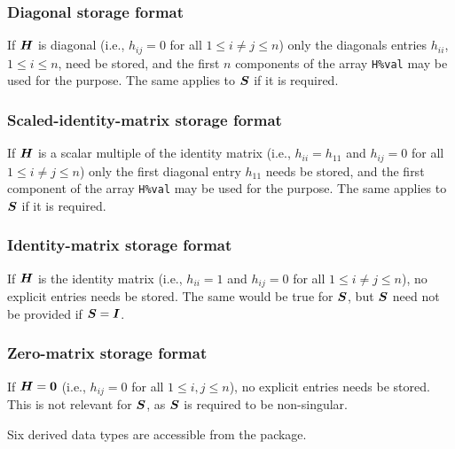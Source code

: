 \documentclass{galahad}
\begin{document}
\subsubsection{Diagonal storage format}\label{diagonal}
If ${\bm{H}}$ is diagonal (i.e., $h_{ij} = 0$ for all $1 \leq i \neq j \leq n$)
only the diagonals entries $h_{ii}$, $1 \leq i \leq n$,  need be stored,
and the first $n$ components of the array {\tt H\%val} may be used for
the purpose. The same applies to ${\bm{S}}$ if it is required.

\subsubsection{Scaled-identity-matrix storage format}\label{scaled-identity}
If ${\bm{H}}$ is a scalar multiple of the identity matrix
(i.e., $h_{ii} = h_{11}$  and $h_{ij} = 0$ for all $1 \leq i \neq j \leq n$)
only the first diagonal entry $h_{11}$ needs be stored,
and the first component of the array {\tt H\%val} may be used for
the purpose. The same applies to ${\bm{S}}$ if it is required.

\subsubsection{Identity-matrix storage format}\label{identity}
If ${\bm{H}}$ is the identity matrix
(i.e., $h_{ii} = 1$ and $h_{ij} = 0$ for all $1 \leq i \neq j \leq n$),
no explicit entries needs be stored. The same would be true for ${\bm{S}}$, but
${\bm{S}}$ need not be provided if ${\bm{S}} = {\bm{I}}$.

\subsubsection{Zero-matrix storage format}\label{zero}
If ${\bm{H}} = {\bm{0}}$ (i.e., $h_{ij} = 0$ for all $1 \leq i, j \leq n$),
no explicit entries needs be stored. This is not relevant for ${\bm{S}}$,
as ${\bm{S}}$ is required to be non-singular.








\galtypes
Six derived data types are accessible from the package.

\end{document}
